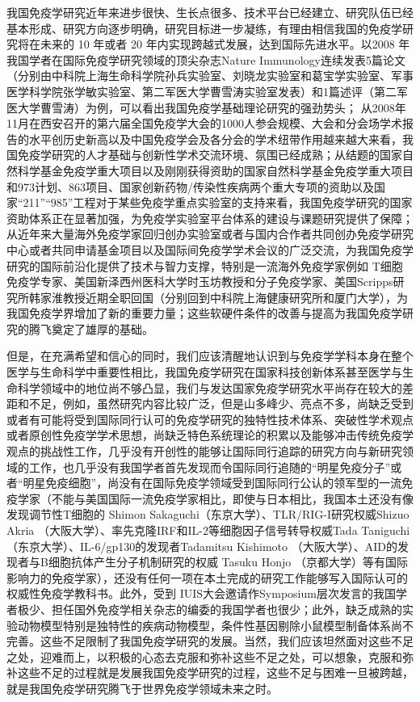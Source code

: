 我国免疫学研究近年来进步很快、生长点很多、技术平台已经建立、研究队伍已经基本形成、研究方向逐步明确，研究目标进一步凝练，有理由相信我国的免疫学研究将在未来的
10 年或者 20 年内实现跨越式发展，达到国际先进水平。以2008
年我国学者在国际免疫学研究领域的顶尖杂志Nature
Immunology连续发表5篇论文（分别由中科院上海生命科学院孙兵实验室、刘晓龙实验室和葛宝学实验室、军事医学科学院张学敏实验室、第二军医大学曹雪涛实验室发表）和1篇述评（第二军医大学曹雪涛）为例，可以看出我国免疫学基础理论研究的强劲势头；
从2008年11月在西安召开的第六届全国免疫学大会的1000人参会规模、大会和分会场学术报告的水平创历史新高以及中国免疫学会及各分会的学术纽带作用越来越大来看，我国免疫学研究的人才基础与创新性学术交流环境、氛围已经成熟；从结题的国家自然科学基金免疫学重大项目以及刚刚获得资助的国家自然科学基金免疫学重大项目和973计划、863项目、国家创新药物/传染性疾病两个重大专项的资助以及国家“211”“985”工程对于某些免疫学重点实验室的支持来看，我国免疫学研究的国家资助体系正在显著加强，为免疫学实验室平台体系的建设与课题研究提供了保障；从近年来大量海外免疫学家回归创办实验室或者与国内合作者共同创办免疫学研究中心或者共同申请基金项目以及国际间免疫学学术会议的广泛交流，为我国免疫学研究的国际前沿化提供了技术与智力支撑，特别是一流海外免疫学家例如
T细胞免疫学专家、美国新泽西州医科大学时玉坊教授和分子免疫学家、美国Scripps研究所韩家淮教授近期全职回国（分别回到中科院上海健康研究所和厦门大学），为我国免疫学界增加了新的重要力量；这些软硬件条件的改善与提高为我国免疫学研究的腾飞奠定了雄厚的基础。

但是，在充满希望和信心的同时，我们应该清醒地认识到与免疫学学科本身在整个医学与生命科学中重要性相比，我国免疫学研究在国家科技创新体系甚至医学与生命科学领域中的地位尚不够凸显，我们与发达国家免疫学研究水平尚存在较大的差距和不足，例如，虽然研究内容比较广泛，但是山多峰少、亮点不多，尚缺乏受到或者有可能将受到国际同行认可的免疫学研究的独特性技术体系、突破性学术观点或者原创性免疫学学术思想，尚缺乏特色系统理论的积累以及能够冲击传统免疫学观点的挑战性工作，几乎没有开创性的能够让国际同行追踪的研究方向与新研究领域的工作，也几乎没有我国学者首先发现而令国际同行追随的“明星免疫分子”或者“明星免疫细胞”，尚没有在国际免疫学领域受到国际同行公认的领军型的一流免疫学家（不能与美国国际一流免疫学家相比，即使与日本相比，我国本土还没有像发现调节性T细胞的
Shimon Sakaguchi（东京大学）、TLR/RIG-I研究权威Shizuo Akria
（大阪大学）、率先克隆IRF和IL-2等细胞因子信号转导权威Tada Taniguchi
（东京大学）、IL-6/gp130的发现者Tadamitsu Kishimoto
（大阪大学）、AID的发现者与B细胞抗体产生分子机制研究的权威 Tasuku Honjo
（京都大学）等有国际影响力的免疫学家），还没有任何一项在本土完成的研究工作能够写入国际认可的权威性免疫学教科书。此外，受到
IUIS大会邀请作Symposium层次发言的我国学者极少、担任国外免疫学相关杂志的编委的我国学者也很少；此外，缺乏成熟的实验动物模型特别是独特性的疾病动物模型，条件性基因剔除小鼠模型制备体系尚不完善。这些不足限制了我国免疫学研究的发展。当然，我们应该坦然面对这些不足之处，迎难而上，以积极的心态去克服和弥补这些不足之处，可以想象，克服和弥补这些不足的过程就是发展我国免疫学研究的过程，这些不足与困难一旦被跨越，就是我国免疫学研究腾飞于世界免疫学领域未来之时。

